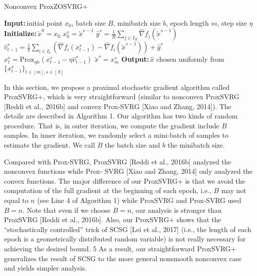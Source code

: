 \documentclass{article}
\newcommand*{\Po}{\text{Prox}}
\newcommand{\Initialize}{\textbf{Initialize:}{\,}}
\newcommand{\Input}{\textbf{Input:}{\,}}
\newcommand{\Output}{\textbf{Output:}{\,}}
\theoremstyle{definition}
\theoremstyle{remark}
\begin{document}
\begin{algorithm}\label{APGnonconvex-Algo}
\caption{Nonconvex ProxZOSVRG+}
\begin{algorithmic}[1]
\State\Input initial point $x_0$, batch size $B$, minibatch size $b$, epoch length $m$, step size $\eta$
\State\Initialize $\tilde{x}^0 = x_0$
\State $x_0^s = \widetilde{x}^{s-1}$
\State $\hat{g}^s = \frac{1}{B} \sum_{j\in I_B} \hat{\nabla} f_j (\widetilde{x}^{s-1})$
\State ${\hat{v}}_{t-1}^s = \frac{1}{b} \sum_{i\in I_b}\left(\hat{\nabla} f_{i}(x_{t-1}^s)-\hat{\nabla} f_{i}(\tilde{x}^{s-1})\right)+\hat{g}^s$
\State $x_{t}^s= \Po_{\eta h}(x_{t-1}^s - \eta \hat{v}_{t-1}^s)$
\EndFor
\State $\widetilde{x}^{s} = x_m^s$
 \EndFor
 \State\Output $\hat{x}$ chosen uniformly from $\{x_{t-1}^s\}_{t\in [m], s\in [S]}$
\end{algorithmic}
\end{algorithm}
{\color{Violet}
In this section, we propose a proximal stochastic gradient algorithm called ProxSVRG+, which is very straightforward
(similar to nonconvex ProxSVRG [Reddi et al., 2016b] and convex Prox-SVRG [Xiao and Zhang, 2014]). The details
are described in Algorithm 1.
{\color{Brown}
Our algorithm has two kinds of random procedure. That is, in outer iteration,
we compute the gradient include $B$ samples. In inner iteration, we randomly select a mini-batch of samples to estimate the gradient.}
 We call $B$ the batch size and $b$ the minibatch size.

Compared with Prox-SVRG, ProxSVRG [Reddi et al., 2016b] analyzed the nonconvex functions while Prox-
SVRG [Xiao and Zhang, 2014] only analyzed the convex functions. The major difference of our ProxSVRG+ is that
we avoid the computation of the full gradient at the beginning of each epoch, i.e., $B$ may not equal to $n$ (see Line 4 of Algorithm 1) while ProxSVRG and Prox-SVRG used $B = n$. Note that even if we choose $B = n$, our analysis is
stronger than ProxSVRG [Reddi et al., 2016b]. Also, our ProxSVRG+ shows that the “stochastically controlled”
trick of SCSG [Lei et al., 2017] (i.e., the length of each epoch is a geometrically distributed random variable) is not
really necessary for achieving the desired bound. 5 As a result, our straightforward ProxSVRG+ generalizes the result
of SCSG to the more general nonsmooth nonconvex case and yields simpler analysis.
}
\end{document}
